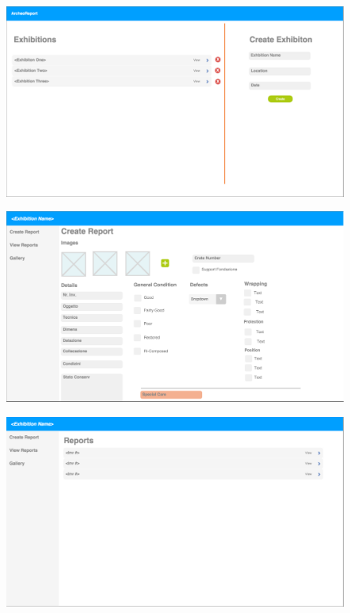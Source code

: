 \documentclass[12pt]{article}
\begin{document}
\begin{figure}
  \includegraphics[scale=0.5]{mockup1.png}
\end{figure}
\begin{figure}
  \includegraphics[scale=0.5]{mockup2.png}
\end{figure}
\begin{figure}
  \includegraphics[scale=0.5]{mockup3.png}
\end{figure}
\end{document}
